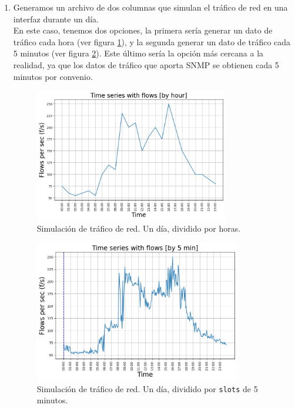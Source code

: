 \documentclass[a4paper, oneside, 12pt]{book}
\begin{document}
	\begin{enumerate}
		\item Generamos un archivo de dos columnas que simulan el tráfico de red en una interfaz durante un día. \\
		
		En este caso, tenemos dos opciones, la primera sería generar un dato de tráfico cada hora (ver figura \ref{img: anexo 1}), y la segunda generar un dato de tráfico cada 5 minutos (ver figura \ref{img: anexo 2}). Este último sería la opción más cercana a la realidad, ya que los datos de tráfico que aporta SNMP se obtienen cada 5 minutos por convenio.
		
		\begin{figure}[h!]
			\includegraphics[width=0.8\textwidth, center]{img/anexo_1.png}
			\caption{Simulación de tráfico de red. Un día, dividido por horas.}
			\label{img: anexo 1}
		\end{figure}
	
		\pagebreak
		
		\begin{figure}[h!]
			\includegraphics[width=0.85\textwidth, center]{img/anexo_2.png}
			\caption{Simulación de tráfico de red. Un día, dividido por \texttt{slots} de 5 minutos.}
			\label{img: anexo 2}
		\end{figure}
	

\end{enumerate}
\end{document}
